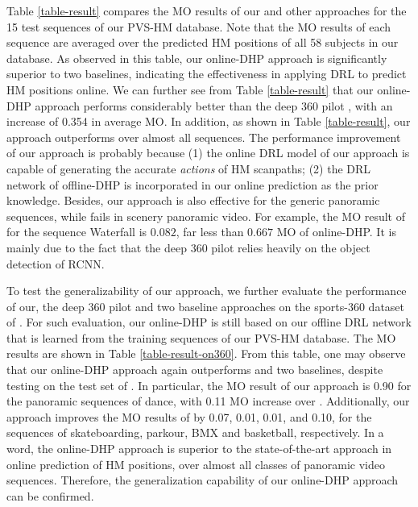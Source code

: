 \documentclass[10pt,journal,compsoc]{IEEEtran}
\begin{document}
Table \ref{table-result} compares the MO results of our and other approaches for the 15 test sequences of our PVS-HM database. Note that the MO results of each sequence are averaged over the predicted HM positions of all 58 subjects in our database. As observed in this table, our online-DHP approach is significantly superior to two baselines, indicating the effectiveness in applying DRL to predict HM positions online.
We can further see from Table \ref{table-result} that our online-DHP approach performs considerably better than the deep 360 pilot \cite{hu2017deep}, with an increase of 0.354 in average MO.
In addition, as shown in Table \ref{table-result}, our approach outperforms \cite{hu2017deep} over almost all sequences.
The performance improvement of our approach is probably because (1) the online DRL model of our approach is capable of generating the accurate \textit{actions} of HM scanpaths; (2) the DRL network of offline-DHP is incorporated in our online prediction as the prior knowledge. Besides, our approach is also effective for the generic panoramic sequences, while \cite{hu2017deep} fails in scenery panoramic video. For example, the MO result of \cite{hu2017deep} for the sequence Waterfall is $0.082$, far less than $0.667$ MO of online-DHP. It is mainly due to the fact that the deep 360 pilot \cite{hu2017deep} relies heavily on the object detection of RCNN.

To test the generalizability of our approach, we further evaluate the performance of our, the deep 360 pilot \cite{hu2017deep} and two baseline approaches on the  sports-360 dataset of \cite{hu2017deep}. For such evaluation, our online-DHP is still based on our offline DRL network that is learned from the training sequences of our PVS-HM database. The MO results are shown in Table \ref{table-result-on360}. From this table, one may observe that our online-DHP approach again outperforms \cite{hu2017deep} and two baselines, despite testing on the test set of \cite{hu2017deep}. In particular, the MO result of our approach is 0.90  for the panoramic sequences of dance, with 0.11 MO increase over \cite{hu2017deep}. Additionally, our approach improves the MO results of \cite{hu2017deep} by 0.07, 0.01, 0.01, and 0.10, for the sequences of skateboarding, parkour, BMX and basketball, respectively. In a word, the online-DHP approach is superior to the state-of-the-art approach \cite{hu2017deep} in online prediction of HM positions, over almost all classes of panoramic video sequences.  Therefore, the generalization capability of our online-DHP approach can be confirmed.
\end{document}
